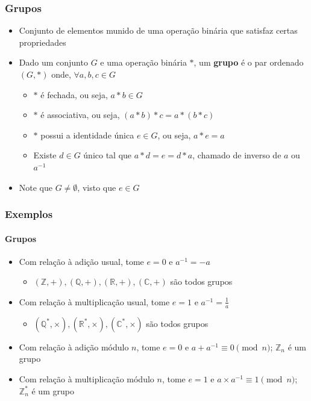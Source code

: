 \documentclass[12pt]{beamer}
\begin{document}
\begin{frame}
  \frametitle{Grupos}
  \begin{itemize}
    \item<1-> Conjunto de elementos munido de uma operação binária que satisfaz
        certas propriedades
    \item<2-> Dado um conjunto $G$ e uma operação binária $*$, um \textbf{grupo} é
        o par ordenado $(G, *)$ onde, $\forall a, b, c \in G$
    \begin{itemize}[itemsep=0pt]
      \item<3-> $*$ é fechada, ou seja, $a * b \in G$
      \item<4-> $*$ é associativa, ou seja, $(a * b) * c = a * (b * c)$
      \item<5-> $*$ possui a identidade única $e \in G$, ou seja, $a * e  = a$
      \item<6-> Existe $d \in G$ único tal que $a * d = e = d * a$, chamado de
          inverso de $a$ ou $a^{-1}$
    \end{itemize}
    \item<7-> Note que $G \neq \emptyset$, visto que $e \in G$
  \end{itemize}
\end{frame}

\begin{frame}
  \frametitle{Exemplos}
  \framesubtitle{Grupos}
  \begin{itemize}
    \item<1-> Com relação à adição usual, tome $e = 0$ e $a^{-1} = -a$
    \begin{itemize}
      \item $(\mathbb{Z}, +), (\mathbb{Q}, +), (\mathbb{R}, +), (\mathbb{C},
          +)$ são todos grupos
    \end{itemize}
    \item<2-> Com relação à multiplicação usual, tome $e = 1$ e $a^{-1} =
        \frac{1}{a}$
    \begin{itemize}
      \item $(\mathbb{Q}^{*}, \times), (\mathbb{R}^{*}, \times),
          (\mathbb{C}^{*}, \times)$ são todos grupos
    \end{itemize}
    \item<3-> Com relação à adição módulo $n$, tome $e = 0$ e $a +
        a^{-1} \equiv 0 \pmod{n}$; $\mathbb{Z}_{n}$ é um grupo
    \item<4-> Com relação à multiplicação módulo $n$, tome $e = 1$ e $a \times
        a^{-1} \equiv 1 \pmod{n}$; $\mathbb{Z}_{n}^{*}$ é um grupo
  \end{itemize}
\end{frame}
\end{document}

